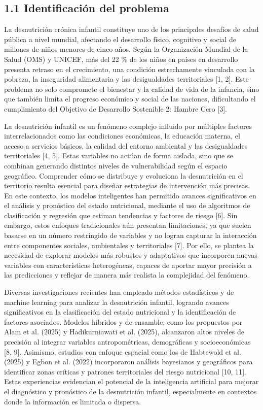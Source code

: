 \documentclass[
]{report}
\begin{document}
\subsection{1.1 Identificación del problema}\label{identificaciuxf3n-del-problema}

La desnutrición crónica infantil constituye uno de los principales desafíos de salud pública a nivel mundial, afectando el desarrollo físico, cognitivo y social de millones de niños menores de cinco años. Según la Organización Mundial de la Salud (OMS) y UNICEF, más del 22 \% de los niños en países en desarrollo presenta retraso en el crecimiento, una condición estrechamente vinculada con la pobreza, la inseguridad alimentaria y las desigualdades territoriales {[}1, 2{]}. Este problema no solo compromete el bienestar y la calidad de vida de la infancia, sino que también limita el progreso económico y social de las naciones, dificultando el cumplimiento del Objetivo de Desarrollo Sostenible 2: Hambre Cero {[}3{]}.

La desnutrición infantil es un fenómeno complejo influido por múltiples
factores interrelacionados como las condiciones económicas, la educación
materna, el acceso a servicios básicos, la calidad del entorno ambiental
y las desigualdades territoriales {[}4, 5{]}. Estas variables no
actúan de forma aislada, sino que se combinan generando distintos
niveles de vulnerabilidad según el espacio geográfico. Comprender cómo
se distribuye y evoluciona la desnutrición en el territorio resulta
esencial para diseñar estrategias de intervención más precisas. En este
contexto, los modelos inteligentes han permitido avances significativos
en el análisis y pronóstico del estado nutricional, mediante el uso de
algoritmos de clasificación y regresión que estiman tendencias y
factores de riesgo {[}6{]}. Sin embargo, estos enfoques tradicionales
aún presentan limitaciones, ya que suelen basarse en un número
restringido de variables y no logran capturar la interacción entre
componentes sociales, ambientales y territoriales {[}7{]}. Por ello, se
plantea la necesidad de explorar modelos más robustos y adaptativos que
incorporen nuevas variables con características heterogéneas, capaces de
aportar mayor precisión a las predicciones y reflejar de manera más
realista la complejidad del fenómeno.

Diversas investigaciones recientes han empleado métodos estadísticos y
de machine learning para analizar la desnutrición infantil, logrando
avances significativos en la clasificación del estado nutricional y la
identificación de factores asociados. Modelos híbridos y de ensamble,
como los propuestos por Alam et al. (2025) y Hadikurniawati et al.
(2025), alcanzaron altos niveles de precisión al integrar variables
antropométricas, demográficas y socioeconómicas {[}8, 9{]}.
Asimismo, estudios con enfoque espacial como los de Habtewold et al.
(2025) y Egbon et al. (2022) incorporaron análisis bayesianos y
geográficos para identificar zonas críticas y patrones territoriales del
riesgo nutricional {[}10, 11{]}. Estas experiencias evidencian el
potencial de la inteligencia artificial para mejorar el diagnóstico y
pronóstico de la desnutrición infantil, especialmente en contextos donde
la información es limitada o dispersa.
\end{document}
